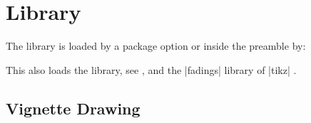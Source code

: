 \clearpage
\section{Library }\label{sec:vignette}%
%
The library is loaded by a package option or inside the preamble by:
\begin{dispListing}
\end{dispListing}
This also loads the  library, see ,
and the |fadings| library of |tikz| \cite{tantau:tikz_and_pgf}.


\subsection{Vignette Drawing}\label{subsec:vignettedrawing}

